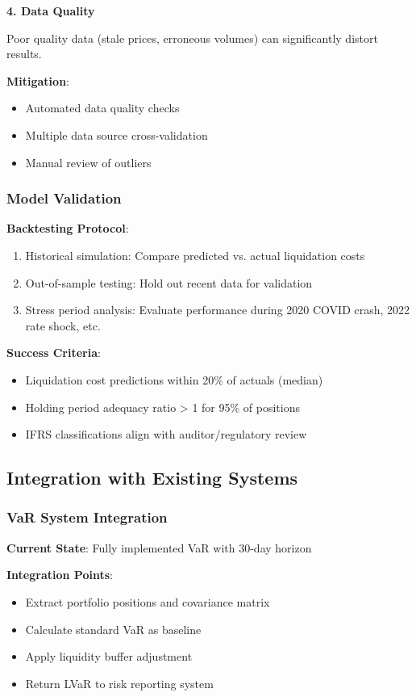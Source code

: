 \documentclass[11pt,a4paper]{article}
\begin{document}
\textbf{4. Data Quality}

Poor quality data (stale prices, erroneous volumes) can significantly distort results.

\textbf{Mitigation}:
\begin{itemize}
    \item Automated data quality checks
    \item Multiple data source cross-validation
    \item Manual review of outliers
\end{itemize}

\subsubsection{Model Validation}

\textbf{Backtesting Protocol}:
\begin{enumerate}
    \item Historical simulation: Compare predicted vs. actual liquidation costs
    \item Out-of-sample testing: Hold out recent data for validation
    \item Stress period analysis: Evaluate performance during 2020 COVID crash, 2022 rate shock, etc.
\end{enumerate}

\textbf{Success Criteria}:
\begin{itemize}
    \item Liquidation cost predictions within 20\% of actuals (median)
    \item Holding period adequacy ratio > 1 for 95\% of positions
    \item IFRS classifications align with auditor/regulatory review
\end{itemize}

\subsection{Integration with Existing Systems}

\subsubsection{VaR System Integration}

\textbf{Current State}: Fully implemented VaR with 30-day horizon

\textbf{Integration Points}:
\begin{itemize}
    \item Extract portfolio positions and covariance matrix
    \item Calculate standard VaR as baseline
    \item Apply liquidity buffer adjustment
    \item Return LVaR to risk reporting system
\end{itemize}
\end{document}
